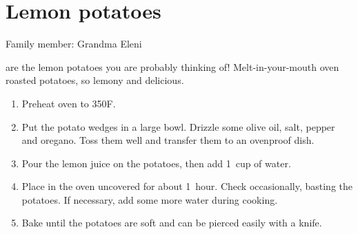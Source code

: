 \chapter{Lemon potatoes}
\label{ch:lemonpotatoes}


Family member: Grandma Eleni

 are the lemon potatoes you are probably thinking of! Melt-in-your-mouth oven roasted potatoes, so lemony and delicious.

\begin{enumerate}
    \item Preheat oven to 350\degree F.
    \item Put the potato wedges in a large bowl. Drizzle some olive oil, salt, pepper and oregano. Toss them well and transfer them to an ovenproof dish.
    \item Pour the lemon juice on the potatoes, then add 1~cup of water.
    \item Place in the oven uncovered for about 1~hour. Check occasionally, basting the potatoes. If necessary, add some more water during cooking.
    \item Bake until the potatoes are soft and can be pierced easily with a knife.
\end{enumerate}
